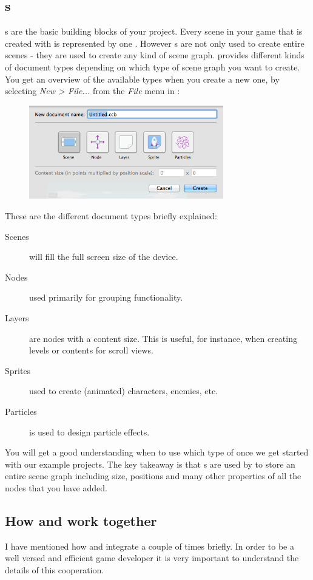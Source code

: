 \subsection{\ccbfile{}s}
\ccbfile{}s are the basic building blocks of your \SB{} project. Every scene in
your game that is created with \SB{} is represented by one \ccbfile{}. However
\ccbfile{}s are not only used to create entire scenes - they are used to create
any kind of scene graph. \SB{} provides different kinds of document types
depending on which type of scene graph you want to create. You get an overview of the
available \ccbfile{} types when you create a new one, by selecting
\textit{New > File... } from the \textit{File} menu in \SB{}:
\label{DocumentTypes}
\begin{figure}[H]
		\centering
		\includegraphics[width=240pt]{images/spritebuilder/new-ccb.png}     
\end{figure} 
These are the different document types briefly explained:
\begin{description}
\item[Scenes] will fill the full screen size of the device.
\item[Nodes] used primarily for grouping functionality.
\item[Layers] are nodes with a content size. This is useful, for instance, when
creating levels or contents for scroll views.
\item[Sprites] used to create (animated) characters, enemies, etc.
\item[Particles] is used to design particle effects.
\end{description}
You will get a good understanding when to use which type of \ccbfile{} once we
get started with our example projects. The key takeaway is that \ccbfile{}s are
used by \SB{} to store an entire scene graph including size, positions and many
other properties of all the nodes that you have added.

\subsection{How \SB{} and \xcode{} work together}
\label{Publish}
I have mentioned how \SB{} and \xcode{} integrate a couple of times briefly. In
order to be a well versed and efficient \SB{} game developer it is very
important to understand the details of this cooperation.

